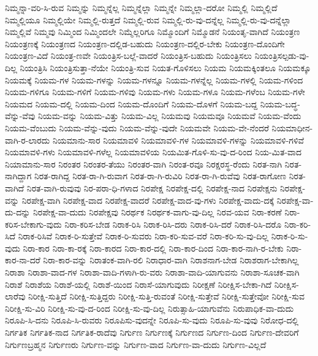 {ನಿಮ್ಮನ್ನಾ-ವರಿ-ಸಿ-ರುವ
ನಿಮ್ಮನ್ನು
ನಿಮ್ಮನ್ನೆಲ್ಲ
ನಿಮ್ಮನ್ನೆಲ್ಲಾ
ನಿಮ್ಮನ್ನೇ
ನಿಮ್ಮಲ್ಲಾ-ದರೋ
ನಿಮ್ಮಲ್ಲಿ
ನಿಮ್ಮಲ್ಲಿದೆ
ನಿಮ್ಮಲ್ಲಿಯೂ
ನಿಮ್ಮಲ್ಲಿಯೇ
ನಿಮ್ಮಲ್ಲಿ-ರುತ್ತದೆ
ನಿಮ್ಮಲ್ಲಿ-ರುವ
ನಿಮ್ಮಲ್ಲಿ-ರು-ವು-ದನ್ನೆಲ್ಲ
ನಿಮ್ಮಲ್ಲಿ-ರು-ವು-ದನ್ನೆಲ್ಲಾ
ನಿಮ್ಮಲ್ಲಿವೆ
ನಿಮ್ಮವು
ನಿಮ್ಮಿಂದ
ನಿಮ್ಮಿಂದಲೇ
ನಿಮ್ಮೆಲ್ಲರಿಗೂ
ನಿಮ್ಮೊಂದಿಗೆ
ನಿಮ್ಮೊಡನೆ
ನಿಯಂತೃ-ವಾಗಿದೆ
ನಿಯಂತ್ರಣ
ನಿಯಂತ್ರಣಕ್ಕೆ
ನಿಯಂತ್ರಣದ
ನಿಯಂತ್ರಣ-ದಲ್ಲಿಡ-ಬಹುದು
ನಿಯಂತ್ರಣ-ದಲ್ಲಿರ-ಬೇಕು
ನಿಯಂತ್ರಣ-ದೊಂದಿಗೇ
ನಿಯಂತ್ರಣ-ವಿದೆ
ನಿಯಂತ್ರ-ಣವೇ
ನಿಯಂತ್ರಿಸ-ಬಲ್ಲೆ-ವಾದರೆ
ನಿಯಂತ್ರಿಸ-ಬಹುದು
ನಿಯಂತ್ರಿಸಲು
ನಿಯಂತ್ರಿಸಲ್ಪಡು-ವು-ದಿಲ್ಲ
ನಿಯಂತ್ರಿಸಿ
ನಿಯಂತ್ರಿಸುತ್ತಾ-ನೆಯೇ
ನಿಯಂತ್ರಿ-ಸುವ
ನಿಯತ-ಗೊಳಿಸಲು
ನಿಯಮ
ನಿಯಮಕ್ಕಿಂತಲೂ
ನಿಯಮಕ್ಕೂ
ನಿಯಮಕ್ಕೆ
ನಿಯಮ-ಗಳ
ನಿಯಮ-ಗಳನ್ನು
ನಿಯಮ-ಗಳನ್ನೂ
ನಿಯಮ-ಗಳನ್ನೆಲ್ಲ
ನಿಯಮ-ಗಳಲ್ಲಿ
ನಿಯಮ-ಗಳಿಂದ
ನಿಯಮ-ಗಳಿಗೂ
ನಿಯಮ-ಗಳಿಗೆ
ನಿಯಮ-ಗಳಿವು
ನಿಯಮ-ಗಳು
ನಿಯಮ-ಗಳೂ
ನಿಯಮ-ಗಳೆಂಬ
ನಿಯಮ-ಗಳೇ
ನಿಯಮದ
ನಿಯಮ-ದಲ್ಲಿ
ನಿಯಮ-ದಿಂದ
ನಿಯಮ-ದೊಂದಿಗೆ
ನಿಯಮ-ದೊಳಗೆ
ನಿಯಮ-ಬದ್ದ
ನಿಯಮ-ಬದ್ಧ-ವೆನ್ನು-ವೆವು
ನಿಯಮ-ವನ್ನು
ನಿಯಮ-ವಿತ್ತು
ನಿಯಮ-ವಿಲ್ಲ
ನಿಯಮವು
ನಿಯಮವೂ
ನಿಯಮವೆ
ನಿಯಮ-ವೆಂದು
ನಿಯಮ-ವೆಂಬುದು
ನಿಯಮ-ವೆನ್ನು-ವುದು
ನಿಯಮ-ವೆನ್ನು-ವುದೇ
ನಿಯಮವೇ
ನಿಯಮ-ವೇ-ನೆಂದರೆ
ನಿಯಮಾಧೀನ-ವಾಗಿ-ರ-ಲಾರದು
ನಿಯಮಾನು-ಸಾರ
ನಿಯಮಾವಳಿ
ನಿಯಮಾವಳಿ-ಗಳ
ನಿಯಮಾವಳಿ-ಗಳನ್ನು
ನಿಯಮಾವಳಿ-ಗಳಿವೆ
ನಿಯಮಾವಳಿ-ಗಳು
ನಿಯಮಾವಳಿ-ಗಳೆಲ್ಲ
ನಿಯಮಾವಳಿಯ
ನಿಯಮಿತ-ಗೊಳಿ-ಸು-ವು-ದ-ರಿಂದ
ನಿಯ-ಮಿತ-ವಾದ
ನಿಯಾಮಾನು-ಸಾರ
ನಿರಂತರ
ನಿರಂತರ-ತೆಯು
ನಿರಂತರ-ವಾಗಿ
ನಿರಂತ-ರವೂ
ನಿರಕ್ಷರಸ್ಥ-ರೆಂದು
ನಿರತ-ನಾಗಿ
ನಿರತ-ನಾಗಿದ್ದಾಗ
ನಿರತ-ರಾಗಿದ್ದ
ನಿರತ-ರಾ-ಗಿ-ರುವಾಗ
ನಿರತ-ರಾ-ಗಿ-ರುವಿರಿ
ನಿರತ-ರಾ-ಗಿ-ರುವೆವು
ನಿರತ-ರಾಗೋಣ
ನಿರತ-ವಾಗಿದೆ
ನಿರತ-ವಾಗಿ-ರುವುವು
ನಿರ-ಪರಾ-ಧಿ-ಗಳಾದ
ನಿರಪೇಕ್ಷ
ನಿರಪೇಕ್ಷ-ದಲ್ಲಿ
ನಿರಪೇಕ್ಷ-ನಾದ
ನಿರಪೇಕ್ಷನು
ನಿರಪೇಕ್ಷ-ವನ್ನು
ನಿರಪೇಕ್ಷ-ವಾಗಿ
ನಿರಪೇಕ್ಷ-ವಾದ
ನಿರಪೇಕ್ಷ-ವಾದರೆ
ನಿರಪೇಕ್ಷ-ವಾದ-ವು-ಗಳು
ನಿರಪೇಕ್ಷ-ವಾದು-ದಕ್ಕೆ
ನಿರಪೇಕ್ಷ-ವಾ-ದು-ದನ್ನು
ನಿರಪೇಕ್ಷ-ವಾ-ದುದು
ನಿರಪೇಕ್ಷವು
ನಿರರ್ಥಕ
ನಿರರ್ಥಕ-ವಾಗು-ವು-ದಿಲ್ಲ
ನಿರವ-ಯವ
ನಿರಾ-ಕರಣೆ
ನಿರಾ-ಕರಿಸ-ಬೇಕಾಗು-ವುದು
ನಿರಾ-ಕರಿಸ-ಬೇಡ
ನಿರಾಕ-ರಿಸಿ
ನಿರಾಕ-ರಿಸಿ-ದರು
ನಿರಾಕ-ರಿಸಿ-ದರೆ
ನಿರಾಕ-ರಿಸಿ-ದರೊ
ನಿರಾ-ಕರಿ-ಸಿದೆ
ನಿರಾಕ-ರಿಸಿವೆ
ನಿರಾಕ-ರಿ-ಸುತ್ತೇವೆ
ನಿರಾಕ-ರಿ-ಸುವರು
ನಿರಾ-ಕರಿ-ಸುವ-ವರೆ
ನಿರಾ-ಕರಿ-ಸು-ವು-ದಿಲ್ಲ
ನಿರಾಕ-ರಿ-ಸು-ವುದು
ನಿರಾ-ಕಾರ
ನಿರಾ-ಕಾ-ರಕ್ಕೆ
ನಿರಾ-ಕಾರದ
ನಿರಾ-ಕಾರ-ದಲ್ಲಿ
ನಿರಾ-ಕಾರ-ದಿಂದ
ನಿರಾ-ಕಾರ-ನಾಗಿ-ರ-ಬೇಕು
ನಿರಾ-ಕಾರ-ನಾ-ದರೆ
ನಿರಾ-ಕಾರ-ವನ್ನು
ನಿರಾತಂಕ-ವಾಗಿ-ರಲಿ
ನಿರಾಧಾರ-ವಾಗಿ
ನಿರಾಶನಾಗ-ಬೇಡ
ನಿರಾಶರಾಗ-ಬೇಕಾಗಿಲ್ಲ
ನಿರಾಶಾ
ನಿರಾಶಾ-ವಾದ-ಗಳ
ನಿರಾಶಾ-ವಾದಿ-ಗಳಾಗಿ-ರು-ವರು
ನಿರಾಶಾ-ವಾದಿ-ಯಾಗುವನು
ನಿರಾಶಾ-ಸೂಚಕ-ವಾಗಿ
ನಿರಾಶೆ
ನಿರಾಶೆಯ
ನಿರಾಶೆ-ಯಲ್ಲಿ
ನಿರಾಶೆ-ಯಿಂದ
ನಿರಾಸೆ-ಯಾಗುವುದು
ನಿರೀಕ್ಷಣೆ
ನಿರೀಕ್ಷಿಸ-ಬೇಕಾ-ಗಿದೆ
ನಿರೀಕ್ಷಿಸ-ಲಾರೆವು
ನಿರೀಕ್ಷಿ-ಸುತ್ತಿದೆ
ನಿರೀಕ್ಷಿ-ಸುತ್ತಿದ್ದರು
ನಿರೀಕ್ಷಿ-ಸುತ್ತಿ-ರುವಂತೆ
ನಿರೀಕ್ಷಿ-ಸುತ್ತೇವೆ
ನಿರೀಕ್ಷಿ-ಸುತ್ತೇವೋ
ನಿರೀಕ್ಷಿ-ಸುವ
ನಿರೀಕ್ಷಿ-ಸು-ವಿರಿ
ನಿರೀಕ್ಷಿ-ಸು-ವು-ದ-ರಿಂದ
ನಿರೀಕ್ಷಿ-ಸು-ವು-ದಿಲ್ಲ
ನಿರುತ್ಸಾಹಿ-ಯಾಗುವೆನು
ನಿರುಪಾಧಿಕ-ವಾ-ದುದು
ನಿರೂಪಿ-ಸಿ-ದನು
ನಿರೂಪಿ-ಸಿ-ರುವರು
ನಿರೂಪಿಸು-ವುದನ್ನೇ
ನಿರೂಪಿ-ಸು-ವುದು
ನಿರೂಪಿ-ಸು-ವುವು
ನಿರೋಧ-ದಲ್ಲಿ
ನಿರ್ಗತಿಕ
ನಿರ್ಗತಿಕ-ನಾದ
ನಿರ್ಗತಿಕ-ರಾದೆವು
ನಿರ್ಗುಣ
ನಿರ್ಗುಣಕ್ಕೆ
ನಿರ್ಗುಣದ
ನಿರ್ಗುಣ-ದಿಂದ
ನಿರ್ಗುಣ-ದೇವರಿಗೆ
ನಿರ್ಗುಣಬ್ರಹ್ಮನ
ನಿರ್ಗುಣರು
ನಿರ್ಗುಣ-ವನ್ನು
ನಿರ್ಗುಣ-ವಾದ
ನಿರ್ಗುಣ-ವಾ-ದುದು
ನಿರ್ಗುಣ-ವಿಲ್ಲದೆ
}
